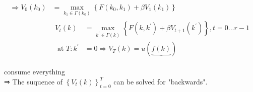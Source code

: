 \documentclass[10pt]{article}
\begin{document}
$$
\begin{aligned}
\Rightarrow V_{0}\left(k_{0}\right) & =\max _{k_{1} \in \Gamma\left(k_{0}\right)}\left\{F\left(k_{0}, k_{1}\right)+\beta V_{1}\left(k_{1}\right)\right\} \\
& \begin{aligned}
V_{t}(k) & =\max _{k^{\prime} \in \Gamma(k)}\left\{F\left(k, k^{\prime}\right)+\beta V_{t+1}\left(k^{\prime}\right)\right\}, t=0 \ldots r-1 \\
\text { at } T: k^{\prime} & =0 \Rightarrow V_{T}(k)=u(\underbrace{f(k)})
\end{aligned}
\end{aligned}
$$

consume everything\\
⇒ The suquence of $\left\{V_{t}(k)\right\}_{t=0}^{T}$ can be solved for "backwards".
\end{document}
